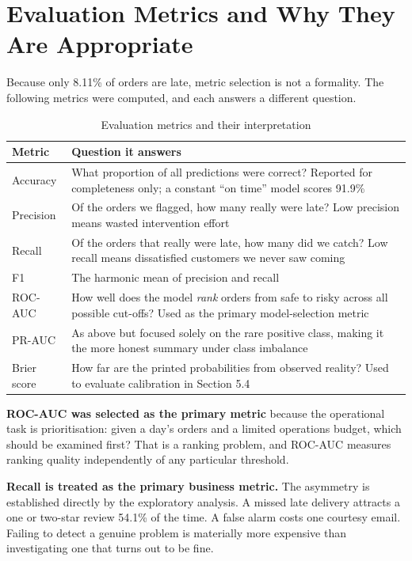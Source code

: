 \documentclass[11pt,a4paper]{report}
\begin{document}
\section{Evaluation Metrics and Why They Are Appropriate}

Because only 8.11\% of orders are late, metric selection is not a formality. The
following metrics were computed, and each answers a different question.

\begin{table}[H]
\centering
\caption{Evaluation metrics and their interpretation}
\begin{tabular}{@{}lp{9.3cm}@{}}
\toprule
\textbf{Metric} & \textbf{Question it answers} \\
\midrule
Accuracy & What proportion of all predictions were correct? Reported for
completeness only; a constant ``on time'' model scores 91.9\% \\
Precision & Of the orders we flagged, how many really were late? Low precision
means wasted intervention effort \\
Recall & Of the orders that really were late, how many did we catch? Low recall
means dissatisfied customers we never saw coming \\
F1 & The harmonic mean of precision and recall \\
ROC-AUC & How well does the model \textit{rank} orders from safe to risky across
all possible cut-offs? Used as the primary model-selection metric \\
PR-AUC & As above but focused solely on the rare positive class, making it the
more honest summary under class imbalance \\
Brier score & How far are the printed probabilities from observed reality?
Used to evaluate calibration in Section 5.4 \\
\bottomrule
\end{tabular}
\end{table}

\textbf{ROC-AUC was selected as the primary metric} because the operational task
is prioritisation: given a day's orders and a limited operations budget, which
should be examined first? That is a ranking problem, and ROC-AUC measures ranking
quality independently of any particular threshold.

\textbf{Recall is treated as the primary business metric.} The asymmetry is
established directly by the exploratory analysis. A missed late delivery
attracts a one or two-star review 54.1\% of the time. A false alarm costs one
courtesy email. Failing to detect a genuine problem is materially more expensive
than investigating one that turns out to be fine.
\end{document}
